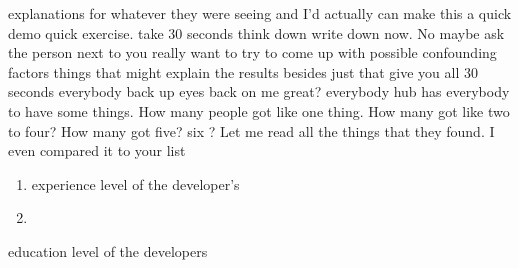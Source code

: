 \documentclass[conference, compsoc, twoside]{IEEEtran}
\begin{document}
explanations for whatever they were
seeing and I'd actually can make this a
quick demo quick exercise.
take 30 seconds think down write down now.
No
maybe ask the person next to you really
want to try to come up with possible
confounding factors things that might
explain the results besides just that
give you all 30 seconds everybody back up eyes back on me great?
everybody hub has everybody to have some
things.
How many people got like one thing. 
How many got like two to four? 
How many got five? six ?
Let me read all the things that they found.
I even compared it to your list
\begin{enumerate}
\item experience level of the developer's
\item
\end{enumerate}

education level of the developers
\end{document}
